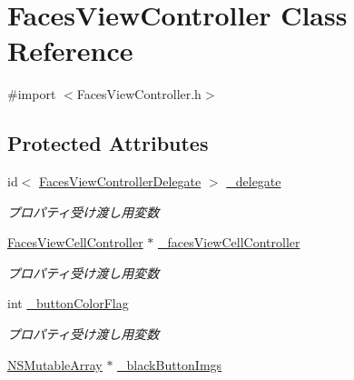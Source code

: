 \hypertarget{interface_faces_view_controller}{
\section{FacesViewController Class Reference}
\label{interface_faces_view_controller}
}


{\ttfamily \#import $<$FacesViewController.h$>$}

\subsection*{Protected Attributes}
\begin{DoxyCompactItemize}
\item 
\hypertarget{interface_faces_view_controller_aa6ab651bbb205936a2b354b9f41a6ad8}{
id$<$ \hyperlink{protocol_faces_view_controller_delegate-p}{FacesViewControllerDelegate} $>$ \hyperlink{interface_faces_view_controller_aa6ab651bbb205936a2b354b9f41a6ad8}{\_\-delegate}}
\label{interface_faces_view_controller_aa6ab651bbb205936a2b354b9f41a6ad8}

\begin{DoxyCompactList}\small\item\em プロパティ受け渡し用変数 \end{DoxyCompactList}\item 
\hypertarget{interface_faces_view_controller_a8e55af70a38e1e0e16f2b14ac33f6984}{
\hyperlink{interface_faces_view_cell_controller}{FacesViewCellController} $\ast$ \hyperlink{interface_faces_view_controller_a8e55af70a38e1e0e16f2b14ac33f6984}{\_\-facesViewCellController}}
\label{interface_faces_view_controller_a8e55af70a38e1e0e16f2b14ac33f6984}

\begin{DoxyCompactList}\small\item\em プロパティ受け渡し用変数 \end{DoxyCompactList}\item 
\hypertarget{interface_faces_view_controller_ab58c5ecde0c1d91bc60d34a64de34fc6}{
int \hyperlink{interface_faces_view_controller_ab58c5ecde0c1d91bc60d34a64de34fc6}{\_\-buttonColorFlag}}
\label{interface_faces_view_controller_ab58c5ecde0c1d91bc60d34a64de34fc6}

\begin{DoxyCompactList}\small\item\em プロパティ受け渡し用変数 \end{DoxyCompactList}\item 
\hypertarget{interface_faces_view_controller_aa7da7392fe616ef36fcfd2110f5c8605}{
\hyperlink{class_n_s_mutable_array}{NSMutableArray} $\ast$ \hyperlink{interface_faces_view_controller_aa7da7392fe616ef36fcfd2110f5c8605}{\_\-blackButtonImgs}}
\label{interface_faces_view_controller_aa7da7392fe616ef36fcfd2110f5c8605}


\end{DoxyCompactItemize}
